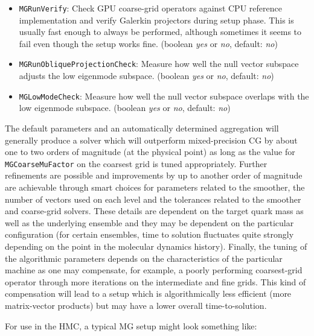 \begin{itemize}
  \item{ \texttt{MGRunVerify}: Check GPU coarse-grid operators against CPU reference implementation and verify Galerkin projectors during setup phase. This is usually fast enough to always be performed, although sometimes it seems to fail even though the setup works fine. (boolean \emph{yes} or \emph{no}, default: \emph{no}) }
  \item{ \texttt{MGRunObliqueProjectionCheck}: Measure how well the null vector subspace adjusts the low eigenmode subspace. (boolean \emph{yes} or \emph{no}, default: \emph{no}) }
  \item{ \texttt{MGLowModeCheck}: Measure how well the null vector subspace overlaps with the low eigenmode subspace. (boolean \emph{yes} or \emph{no}, default: \emph{no}) }
\end{itemize}

The default parameters and an automatically determined aggregation will generally produce a solver which will outperform mixed-precision CG by about one to two orders of magnitude (at the physical point) as long as the value for \texttt{MGCoarseMuFactor} on the coarsest grid is tuned appropriately. Further refinements are possible and improvements by up to another order of magnitude are achievable through smart choices for parameters related to the smoother, the number of vectors used on each level and the tolerances related to the smoother and coarse-grid solvers. These details are dependent on the target quark mass as well as the underlying ensemble and they may be dependent on the particular configuration (for certain ensembles, time to solution fluctuates quite strongly depending on the point in the molecular dynamics history). Finally, the tuning of the algorithmic parameters depends on the characteristics of the particular machine as one may compensate, for example, a poorly performing coarsest-grid operator through more iterations on the intermediate and fine grids. This kind of compensation will lead to a setup which is algorithmically less efficient (more matrix-vector products) but may have a lower overall time-to-solution.

For use in the HMC, a typical MG setup might look something like:

